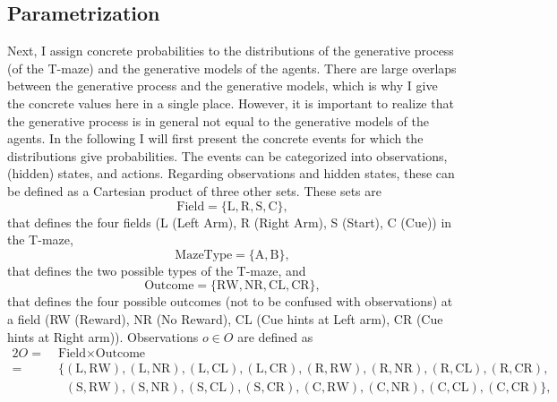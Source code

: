 \subsection{Parametrization}

Next, I assign concrete probabilities to the distributions of the generative process (of the T-maze) and the generative models of the agents. There are large overlaps between the generative process and the generative models, which is why I give the concrete values here in a single place. However, it is important to realize that the generative process is in general not equal to the generative models of the agents. In the following I will first present the concrete events for which the distributions give probabilities. 
The events can be categorized into observations, (hidden) states, and actions. Regarding observations and hidden states, these can be defined as a Cartesian product of three other sets. These sets are
\begin{equation}
    \text{Field} = \{\text{L}, \text{R}, \text{S}, \text{C}\},
\end{equation}
that defines the four fields (L (Left Arm), R (Right Arm), S (Start), C (Cue)) in the T-maze,
\begin{equation}
    \text{MazeType} = \{\text{A}, \text{B}\},
\end{equation}
that defines the two possible types of the T-maze, and
\begin{equation}
    \text{Outcome} = \{\text{RW}, \text{NR}, \text{CL}, \text{CR}\},
\end{equation}
that defines the four possible outcomes (not to be confused with observations) at a field (RW (Reward), NR (No Reward), CL (Cue hints at Left arm), CR (Cue hints at Right arm)).
Observations \(o \in O\) are defined as
\begin{alignat}{2}
    O =\; & \text{Field} \times \text{Outcome}                                                                                                                                             \nonumber \\
    =\;   & \{(\text{L},\text{RW}),(\text{L},\text{NR}),(\text{L},\text{CL}),(\text{L},\text{CR}),(\text{R},\text{RW}),(\text{R},\text{NR}),(\text{R},\text{CL}),(\text{R},\text{CR}),     \nonumber \\
          & \;\;(\text{S},\text{RW}),(\text{S},\text{NR}),(\text{S},\text{CL}),(\text{S},\text{CR}),(\text{C},\text{RW}),(\text{C},\text{NR}),(\text{C},\text{CL}),(\text{C},\text{CR})\},
\end{alignat}
